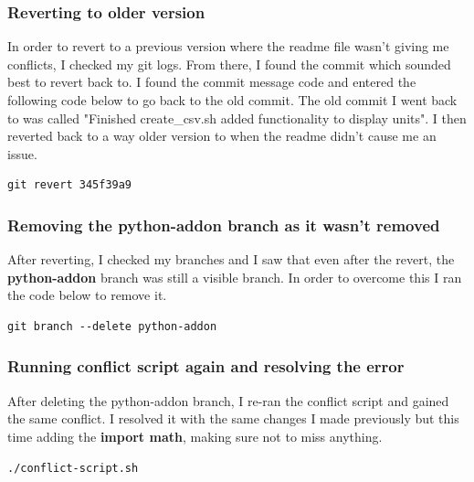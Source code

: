 \documentclass[]{article}
\begin{document}
\subsubsection{Reverting to older version}
In order to revert to a previous version where the readme file wasn't giving me conflicts, I checked my git logs.
From there, I found the commit which sounded best to revert back to. I found the commit message code and entered the following code
below to go back to the old commit. The old commit I went back to was called "Finished create\_csv.sh added functionality to display units".
I then reverted back to a way older version to when the readme didn't cause me an issue.
\begin{tcolorbox}[colback=white, colframe=black, boxrule=1pt, 
    fonttitle=\bfseries, listing only, listing options={language=sh, basicstyle=\ttfamily}]
\begin{verbatim}
git revert 345f39a9
\end{verbatim}
\end{tcolorbox}

\subsubsection{Removing the python-addon branch as it wasn't removed}
After reverting, I checked my branches and I saw that even after the revert, the
\textbf{python-addon} branch was still a visible branch. In order to overcome this I ran the code below to remove it.
\begin{tcolorbox}[colback=white, colframe=black, boxrule=1pt, 
    fonttitle=\bfseries, listing only, listing options={language=sh, basicstyle=\ttfamily}]
\begin{verbatim}
git branch --delete python-addon
\end{verbatim}
\end{tcolorbox}

\subsubsection{Running conflict script again and resolving the error}
After deleting the python-addon branch, I re-ran the conflict script and gained the same conflict.
I resolved it with the same changes I made previously but this time adding the \textbf{import math}, making sure not to miss anything.
\begin{tcolorbox}[colback=white, colframe=black, boxrule=1pt, 
    fonttitle=\bfseries, listing only, listing options={language=sh, basicstyle=\ttfamily}]
\begin{verbatim}
./conflict-script.sh
\end{verbatim}
\end{tcolorbox}
\end{document}
